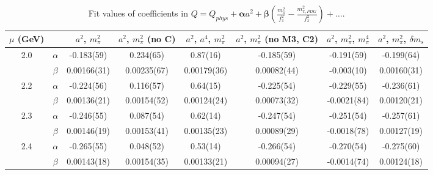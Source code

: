 \documentclass[12pt]{extarticle}
\begin{document}
\begin{table}[h!]
\begin{center}
\begin{tabular}{|c c|c|c|c|c|c|c|}
\hline
$\mu$ (GeV) &  & $a^2$, $m_\pi^2$& $a^2$, $m_\pi^2$ (no C)& $a^2$, $a^4$, $m_\pi^2$& $a^2$, $m_\pi^2$ (no M3, C2)& $a^2$, $m_\pi^2$, $m_\pi^4$& $a^2$, $m_\pi^2$, $\delta m_s$\\
\hline
\multirow{2}{0.5in}{2.0} & $\alpha$ & -0.183(59)& 0.234(65)& 0.87(16)& -0.185(59)& -0.191(59)& -0.199(64)\\
 & $\beta$ & 0.00166(31)& 0.00235(67)& 0.00179(36)& 0.00082(44)& -0.003(10)& 0.00160(31)\\
\hline
\multirow{2}{0.5in}{2.2} & $\alpha$ & -0.224(56)& 0.116(57)& 0.64(15)& -0.225(54)& -0.229(55)& -0.236(61)\\
 & $\beta$ & 0.00136(21)& 0.00154(52)& 0.00124(24)& 0.00073(32)& -0.0021(84)& 0.00120(21)\\
\hline
\multirow{2}{0.5in}{2.3} & $\alpha$ & -0.246(55)& 0.087(54)& 0.62(14)& -0.247(54)& -0.251(54)& -0.257(61)\\
 & $\beta$ & 0.00146(19)& 0.00153(41)& 0.00135(23)& 0.00089(29)& -0.0018(78)& 0.00127(19)\\
\hline
\multirow{2}{0.5in}{2.4} & $\alpha$ & -0.265(55)& 0.048(52)& 0.53(14)& -0.266(54)& -0.270(54)& -0.275(60)\\
 & $\beta$ & 0.00143(18)& 0.00154(35)& 0.00133(21)& 0.00094(27)& -0.0014(74)& 0.00124(18)\\
\hline
\end{tabular}
\caption{Fit values of coefficients in $Q = Q_{phys} + \mathbf{\alpha} a^2 + \mathbf{\beta}\left(\frac{m_\pi^2}{f_\pi^2}-\frac{m_{\pi,PDG}^2}{f_\pi^2}\right) + \ldots$.}
\end{center}
\end{table}
























\clearpage
\end{document}
